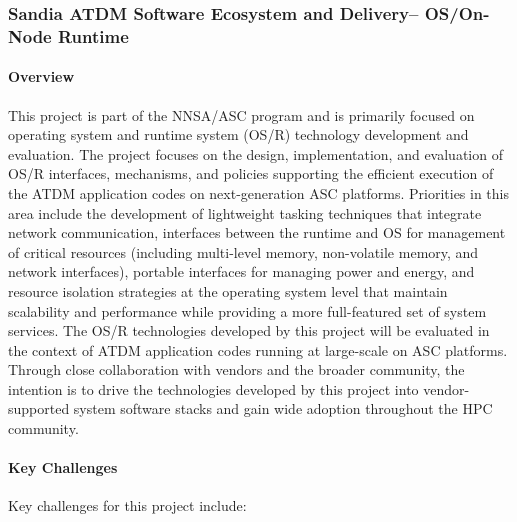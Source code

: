 \subsubsection{ Sandia ATDM Software Ecosystem and Delivery-- OS/On-Node Runtime} 

\paragraph{Overview} 

This project is part of the NNSA/ASC program and is primarily focused
on operating system and runtime system (OS/R) technology
development and evaluation.
The project focuses on the design, implementation, and evaluation of
OS/R interfaces, mechanisms, and policies supporting the efficient
execution of the ATDM application codes on next-generation ASC
platforms. Priorities in this area include the development of
lightweight tasking techniques that integrate network communication,
interfaces between the runtime and OS for management of critical
resources (including multi-level memory, non-volatile memory, and
network interfaces), portable interfaces for managing power and
energy, and resource isolation strategies at the operating system
level that maintain scalability and performance while providing a more
full-featured set of system services. The OS/R technologies developed
by this project will be evaluated in the context of ATDM application
codes running at large-scale on ASC platforms. Through close
collaboration with vendors and the broader community, the intention is
to drive the technologies developed by this project into
vendor-supported system software stacks and gain wide adoption
throughout the HPC community.

\paragraph{Key  Challenges}

Key challenges for this project include:

